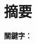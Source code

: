 \documentclass[class=NCU_thesis, crop=false]{standalone}
\begin{document}
\chapter{摘要}


\vspace{2em}
\noindent \textbf{關鍵字：} \keywordsZh{} %
\end{document}
